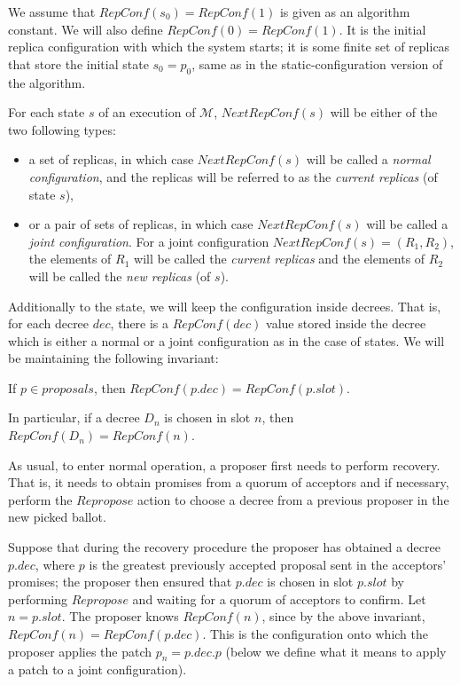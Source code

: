 \documentclass[12pt,a4paper,en]{pracamgr}
\newcommand{\ti}[1]{\textit{#1}}
\newcommand{\mc}[1]{\mathcal{#1}}
\begin{document}
We assume that $RepConf(s_0) = RepConf(1)$ is given as an algorithm constant. We will also define $RepConf(0) = RepConf(1)$. It is the initial replica configuration with which the system starts; it is some finite set of replicas that store the initial state $s_0 = p_0$, same as in the static-configuration version of the algorithm.

For each state $s$ of an execution of $\mc M$, $NextRepConf(s)$ will be either of the two following types:
\begin{itemize}
    \item a set of replicas, in which case $NextRepConf(s)$ will be called a \ti{normal configuration}, and the replicas will be referred to as the \ti{current replicas} (of state $s$),
    \item or a pair of sets of replicas, in which case $NextRepConf(s)$ will be called a \ti{joint configuration}. For a joint configuration $NextRepConf(s) = (R_1, R_2)$, the elements of $R_1$ will be called the \ti{current replicas} and the elements of $R_2$ will be called the \ti{new replicas} (of $s$).
\end{itemize}

Additionally to the state, we will keep the configuration inside decrees. That is, for each decree $dec$, there is a $RepConf(dec)$ value stored inside the decree which is either a normal or a joint configuration as in the case of states. We will be maintaining the following invariant:
\begin{center} If $p \in proposals$, then $RepConf(p.dec) = RepConf(p.slot)$. \end{center}
In particular, if a decree $D_n$ is chosen in slot $n$, then $RepConf(D_n) = RepConf(n)$.

As usual, to enter normal operation, a proposer first needs to perform recovery. That is, it needs to obtain promises from a quorum of acceptors and if necessary, perform the $Repropose$ action to choose a decree from a previous proposer in the new picked ballot.

Suppose that during the recovery procedure the proposer has obtained a decree $p.dec$, where $p$ is the greatest previously accepted proposal sent in the acceptors' promises; the proposer then ensured that $p.dec$ is chosen in slot $p.slot$ by performing $Repropose$ and waiting for a quorum of acceptors to confirm. Let $n = p.slot$. The proposer knows $RepConf(n)$, since by the above invariant, $RepConf(n) = RepConf(p.dec)$. This is the configuration onto which the proposer applies the patch $p_n = p.dec.p$ (below we define what it means to apply a patch to a joint configuration).
\end{document}
